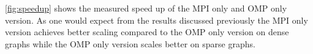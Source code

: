 \autoref{fig:speedup} shows the measured speed up of the MPI only and OMP only version. As one would expect from the results discussed previously the MPI only version achieves better scaling compared to the OMP only version on dense graphs while the OMP only version scales better on sparse graphs.

